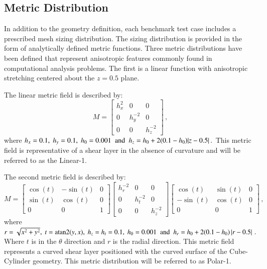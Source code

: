 \documentclass[3p,times,procedia,number]{elsarticle}
\begin{document}
\subsection{Metric Distribution}

In addition to the geometry definition, each benchmark test case includes a prescribed mesh sizing distribution.
The sizing distribution is provided in the form of analytically defined metric functions.
Three metric distributions have been defined that represent anisotropic features commonly found in computational analysis problems.
The first is a linear function with anisotropic stretching centered about the $z=0.5$ plane.

The linear metric field is described by:
\begin{equation}
\label{eq:Linear1}
M = \begin{bmatrix}
h_x^2 & 0 & 0 \\
0 & h_y^{-2} & 0 \\
0 & 0 & h_z^{-2} 
\end{bmatrix} \,,
\end{equation}
where
$h_x = 0.1,\; h_y = 0.1,\; h_0 = 0.001 \textrm{\; and\; } h_z = h_0 + 2 (0.1-h_0) |z-0.5|\,.$
This metric field is representative of a shear layer in
the absence of curvature and will be referred to as the Linear-1.  

The second metric field is described by: 
\begin{equation}
\label{eq:Polar1}
M = 
\begin{bmatrix}
\cos(t) & -\sin(t) & 0 \\ 
\sin(t) & \cos(t) &  0 \\ 
0   &    0   &  1 
\end {bmatrix}
\begin{bmatrix}
h_r^{-2} &  0  &    0   \\ 
0 &   h_t^{-2} &  0  \\  
0 &   0  &  h_z^{-2} 
\end {bmatrix}
\begin{bmatrix}
\cos(t) & \sin(t) &  0  \\
-\sin(t) & \cos(t) &  0  \\
0  &     0  &    1
\end {bmatrix} \,,
\end{equation}
where
$r = \sqrt{x^2+y^2},\; t = \textrm{atan2}(y,x),\; h_z = h_t = 0.1,\; h_0 = 0.001\textrm{\; and\; } h_r = h_0 + 2 (0.1-h_0) \left|r-0.5\right| \,. $
Where $t$ is in the $\theta$ direction and $r$ is the radial direction.
This metric field represents a curved shear layer positioned with the curved surface of the Cube-Cylinder geometry.
This metric distribution will be referred to as Polar-1.
\end{document}
